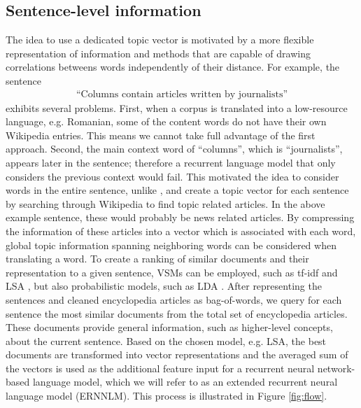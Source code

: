 \documentclass[a4paper]{article}
\begin{document}
\subsection{Sentence-level information} \label{sec:sentence-level}
The idea to use a dedicated topic vector is motivated by a more flexible representation of information and methods that are capable of drawing correlations betweens words independently of their distance.
For example, the sentence 
\begin{align}
\text{``Columns contain articles written by journalists''}
\end{align}
exhibits several problems. First, when a corpus is translated into a low-resource language, e.g. Romanian, some of the content words do not have their own Wikipedia entries. This means we cannot take full advantage of the first approach. Second, the main context word of ``columns'', which is ``journalists'', appears later in the sentence; therefore a recurrent language model that only considers the previous context would fail. 
This motivated the idea to consider words in the entire sentence, unlike \cite{mikolov2012context}, and create a topic vector for each sentence by searching through Wikipedia to find topic related articles. In the above example sentence, these would probably be news related articles. By compressing the information of these articles into a vector which is associated with each word, global topic information spanning neighboring words can be considered when translating a word. 
To create a ranking of similar documents and their representation to a given sentence, VSMs can be employed, such as tf-idf \cite{salton1986introduction} and LSA \cite{bradford2008empirical}, but also probabilistic models, such as LDA \cite{blei2003latent}. After representing the sentences and cleaned encyclopedia articles as bag-of-words, we query for each sentence the most similar documents from the total set of encyclopedia articles. These documents provide general information, such as higher-level concepts, about the current sentence. Based on the chosen model, e.g. LSA, the best documents are transformed into vector representations and the averaged sum of the vectors is used as the additional feature input for a recurrent neural network-based language model, which we will refer to as an extended recurrent neural language model (ERNNLM). This process is illustrated in Figure \ref{fig:flow}.
\end{document}
